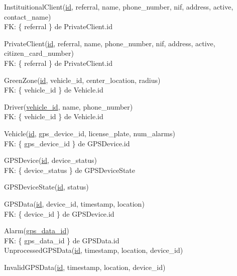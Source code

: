 \documentclass[parskip=full]{scrreprt}
\author{André Páscoa A48089}
\date{03/04/2022}
\begin{document}

    InstituitionalClient(\underline{id}, referral, name, phone\_number, nif, address, active, contact\_name)\\
    FK: \{ referral \} de PrivateClient.id

    PrivateClient(\underline{id}, referral, name, phone\_number, nif,
    address, active, citizen\_card\_number)\\
    FK: \{ referral \} de PrivateClient.id

    GreenZone(\underline{id}, vehicle\_id, center\_location, radius)\\
    FK: \{ vehicle\_id \} de Vehicle.id

    Driver(\underline{vehicle\_id}, name, phone\_number)\\
    FK: \{ vehicle\_id \} de Vehicle.id

    Vehicle(\underline{id}, gps\_device\_id, license\_plate, num\_alarms)\\
    FK: \{ gps\_device\_id \} de GPSDevice.id

    GPSDevice(\underline{id}, device\_status)\\
    FK: \{ device\_status \} de GPSDeviceState

    GPSDeviceState(\underline{id}, status)

    GPSData(\underline{id}, device\_id, timestamp, location)\\
    FK: \{ device\_id \} de GPSDevice.id

    Alarm(\underline{gps\_data\_id})\\
    FK: \{ gps\_data\_id \} de GPSData.id\\

    UnprocessedGPSData(\underline{id}, timestamp, location, device\_id)

    InvalidGPSData(\underline{id}, timestamp, location, device\_id)
\end{document}

